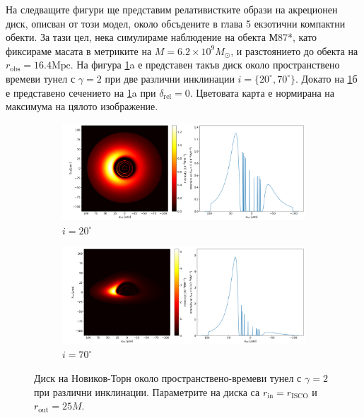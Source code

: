 На следващите фигури ще представим релативистките образи на акреционен диск, описван от този модел, около обсъдените в глава 5 екзотични компактни обекти. За тази цел, нека симулираме наблюдение на обекта М87*, като фиксираме масата в метриките на $M = 6.2\times10^9 M_\odot$, и разстоянието до обекта на $r_\text{obs} = 16.4 \text{Mpc}$. На фигура \ref{WH_NT}a е представен такъв диск около пространствено времеви тунел с $\gamma = 2$ при две различни инклинации $i=\{20^\circ, 70^\circ\}$. Докато на \ref{WH_NT}б е представено сечението на \ref{WH_NT}a при $\delta_\text{rel} = 0$. Цветовата карта е нормирана на максимума на цялото изображение. \\
\newpage

\begin{figure}[!htb]
	\begin{subfigure}{12cm}
		\hspace{-0.6cm}
		\includegraphics[scale = 0.26]{WH_NT_Gamma2_20_deg.png}
		\caption{$i = 20^\circ$} 
	\end{subfigure}
	\begin{subfigure}{12cm}
		\hspace{-0.6cm}
		\includegraphics[scale = 0.26]{WH_NT_Gamma2_70_deg.png}
		\caption{$i = 70^\circ$} 
	\end{subfigure}
	\caption[Диск на Новиков-Торн около пространствено-времеви тунел при различни инклинации.]{\small Диск на Новиков-Торн около пространствено-времеви тунел с $\gamma = 2$ при различни инклинации. Параметрите на диска са $r_\text{in} = r_\text{ISCO}$ и $r_\text{out} = 25M$.} 
	\label{WH_NT}
\end{figure}


